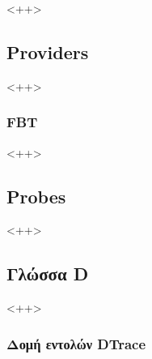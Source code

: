 \documentclass[12pt]{article}
\begin{document}
<++>

\subsection{Providers}


<++>

\subsubsection{FBT} \label{fbt}

<++>

\subsection{Probes}


<++>

\subsection{Γλώσσα D}


<++>

\subsubsection{Δομή εντολών DTrace}

%
%
%
\end{document}
